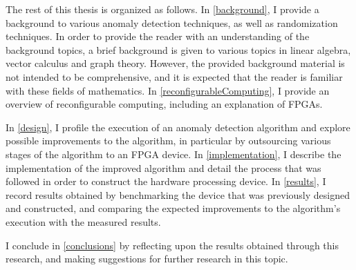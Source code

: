 The rest of this thesis is organized as follows. In \autoref{background}, I
provide a background to various anomaly detection techniques, as well as
randomization techniques. In order to provide the reader with an understanding
of the background topics, a brief background is given to various topics in
linear algebra, vector calculus and graph theory. However, the provided
background material is not intended to be comprehensive, and it is expected that
the reader is familiar with these fields of mathematics. In
\autoref{reconfigurableComputing}, I provide an overview of reconfigurable
computing, including an explanation of \glspl{FPGA}.

In \autoref{design}, I profile the execution of an anomaly detection algorithm
and explore possible improvements to the algorithm, in particular by outsourcing
various stages of the algorithm to an FPGA device. In \autoref{implementation},
I describe the implementation of the improved algorithm and detail the process
that was followed in order to construct the hardware processing device. In
\autoref{results}, I record results obtained by benchmarking the device that was
previously designed and constructed, and comparing the expected improvements to
the algorithm's execution with the measured results.

I conclude in \autoref{conclusions} by reflecting upon the results obtained
through this research, and making suggestions for further research in this
topic.
